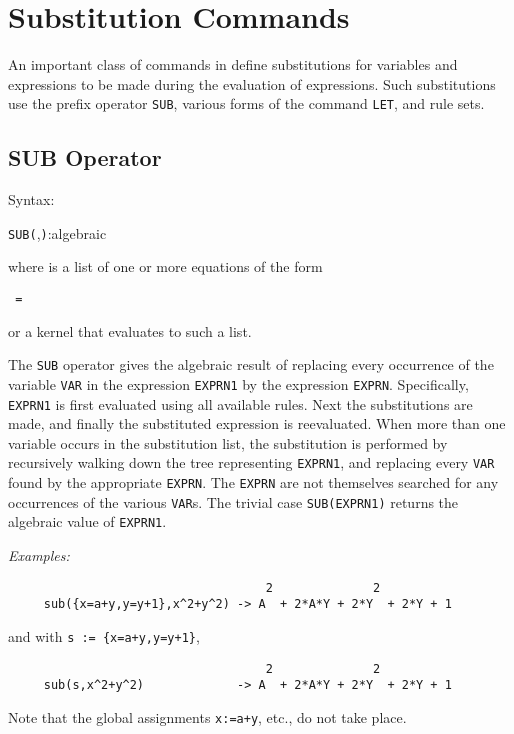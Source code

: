 \chapter{Substitution Commands}

\label{chapter:subst}

An important class of commands in {\REDUCE} define
substitutions for variables and expressions to be made during the
evaluation of expressions.  Such substitutions use the prefix operator
\texttt{SUB}, various forms of the command \texttt{LET}, and rule sets.

\section{SUB Operator}
\hypertarget{operator:SUB}{}

Syntax:
\begin{syntax}
        \texttt{SUB(},\texttt{)}:algebraic
\end{syntax}
where  is a list of one or more equations of the
form
\begin{syntax}
        \texttt{ = }
\end{syntax}
or a kernel that evaluates to such a list.

The \texttt{SUB} operator gives the algebraic result of replacing every
occurrence of the variable \texttt{VAR} in the expression \texttt{EXPRN1} by the
expression \texttt{EXPRN}.  Specifically, \texttt{EXPRN1} is first evaluated
using all available rules.  Next the substitutions are made, and finally
the substituted expression is reevaluated.  When more than one variable
occurs in the substitution list, the substitution is performed by
recursively walking down the tree representing \texttt{EXPRN1}, and replacing
every \texttt{VAR} found by the appropriate \texttt{EXPRN}.  The \texttt{EXPRN} are
not themselves searched for any occurrences of the various \texttt{VAR}s.
The trivial case \texttt{SUB(EXPRN1)} returns the algebraic value of
\texttt{EXPRN1}.

\textit{Examples:}
\begin{verbatim}
                                    2              2
     sub({x=a+y,y=y+1},x^2+y^2) -> A  + 2*A*Y + 2*Y  + 2*Y + 1
\end{verbatim}
and with \texttt{s := \{x=a+y,y=y+1\}},
\begin{verbatim}
                                    2              2
     sub(s,x^2+y^2)             -> A  + 2*A*Y + 2*Y  + 2*Y + 1
\end{verbatim}
Note that the global assignments \texttt{x:=a+y}, etc., do not take place.

